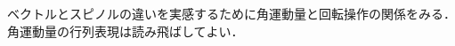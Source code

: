 \documentclass{report}
\begin{document}
  ベクトルとスピノルの違いを実感するために角運動量と回転操作の関係をみる．角運動量の行列表現は読み飛ばしてよい．
\end{document}
